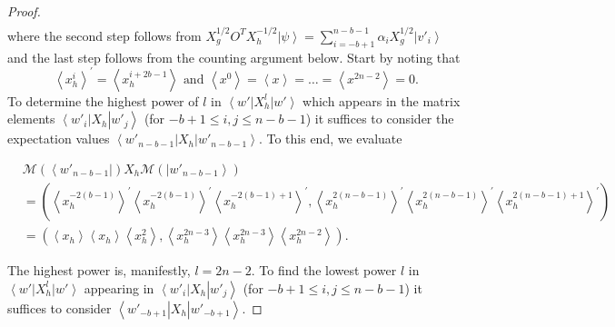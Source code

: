 \documentclass{article}
\begin{document}
\begin{proof}
\begin{align}
  \end{align}
  where the second step follows from $X_{g}^{1/2}O^{T}X_{h}^{-1/2}\left|\psi\right\rangle =\sum_{i=-b+1}^{n-b-1}\alpha_{i}X_{g}^{1/2}\left|v'_{i}\right\rangle $
  and the last step follows from the counting argument below. Start by noting that
  \begin{equation}
    \left\langle x_{h}^{i}\right\rangle ^{\prime}=\left\langle x_{h}^{i+2b-1}\right\rangle  \text{ and  }
    \left\langle x^{0}\right\rangle =\left\langle x\right\rangle =\dots=\left\langle x^{2n-2}\right\rangle =0.\label{eq:monomialmisalignedMochonPowers}
  \end{equation}
  To determine the highest power of $l$ in $\left\langle w'\right|X_{h}^{l}\left|w'\right\rangle $
  which appears in the matrix elements $\left\langle w'_{i}\right|X_{h}\left|w'_{j}\right\rangle $
  (for $-b+1\le i,j\le n-b-1$) it suffices to consider the expectation values $\left\langle w'_{n-b-1}\right|X_{h}\left|w'_{n-b-1}\right\rangle $.
  To this end, we evaluate
  \begin{small}
    \begin{align*}
       & \mathcal{M}(\left\langle w'_{n-b-1}\right|)X_{h}\mathcal{M}(\left|w'_{n-b-1}\right\rangle )                                                                                                                                                                                                                                              \\
       & =\left(\left\langle x_{h}^{-2(b-1)}\right\rangle ^{\prime}\left\langle x_{h}^{-2(b-1)}\right\rangle ^{\prime}\left\langle x_{h}^{-2(b-1)+1}\right\rangle ^{\prime},\left\langle x_{h}^{2(n-b-1)}\right\rangle ^{\prime}\left\langle x_{h}^{2(n-b-1)}\right\rangle ^{\prime}\left\langle x_{h}^{2(n-b-1)+1}\right\rangle ^{\prime}\right) \\
       & =\left(\left\langle x_{h}\right\rangle \left\langle x_{h}\right\rangle \left\langle x_{h}^{2}\right\rangle ,\left\langle x_{h}^{2n-3}\right\rangle \left\langle x_{h}^{2n-3}\right\rangle \left\langle x_{h}^{2n-2}\right\rangle \right).
    \end{align*}
  \end{small}	The highest power is, manifestly, $l=2n-2$. To find the lowest power
  $l$ in $\left\langle w'\right|X_{h}^{l}\left|w'\right\rangle $
  appearing in  $\left\langle w'_{i}\right|X_{h}\left|w'_{j}\right\rangle $
  (for $-b+1\le i,j\le n-b-1$) it suffices to consider $\left\langle w'_{-b+1}\right|X_{h}\left|w'_{-b+1}\right\rangle $.

\end{proof}
\end{document}
